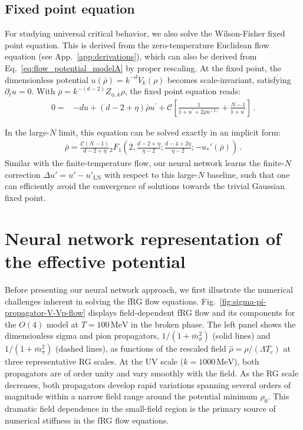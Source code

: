 \documentclass[reprint,twocolumn,superscriptaddress,preprintnumbers,amsmath,amssymb,aps,prd,floatfix]{revtex4-2}
\def\Eq#1{Eq.~\eqref{#1}}
\def\Fig#1{Fig.~\ref{#1}}
\def\App#1{App.~\ref{#1}}
\begin{document}
\subsection{Fixed point equation}
\label{sec:fixedpoint_eq}
For studying universal critical behavior, we also solve the Wilson-Fisher fixed point equation. This is derived from the zero-temperature Euclidean flow equation (see \App{app:derivations}), which can also be derived from \Eq{eq:flow_potential_modelA} by proper rescaling. At the fixed point, the dimensionless potential $u(\bar{\rho})=k^{-d} V_k(\rho)$ becomes scale-invariant, satisfying $\partial_t u = 0$. With $\bar{\rho}=k^{-(d-2)} Z_{\phi, k} \rho$, the fixed point equation reads:
\begin{align}
	0 = & -d u+(d-2+\eta) \bar{\rho} u^{\prime} +\mathscr{C}\left[\frac{1}{1+u^{\prime}+2 \bar{\rho} u^{(2)}}+\frac{N-1}{1+u^{\prime}}\right]\,.
	\label{eq:fixed_point}
\end{align}

In the large-$N$ limit, this equation can be solved exactly in an implicit form:
\begin{align}
	\bar{\rho} = \frac{\mathscr{C}(N-1)}{d-2+\eta}{}_2F_1\left(2,\frac{d-2+\eta}{\eta-2};\frac{d-4+2\eta}{\eta-2};-u_*'(\bar{\rho})\right)\,.
	\label{eq:fixed_point_largeN}
\end{align}
Similar with the finite-temperature flow, our neural network learns the finite-$N$ correction $\Delta u' = u' - u'_{\mathrm{LN}}$ with respect to this large-$N$ baseline, such that one can efficiently avoid the convergence of solutions towards the trivial Gaussian fixed point.



\section{Neural network representation of the effective potential}
\label{sec:PINN}
Before presenting our neural network approach, we first illustrate the numerical challenges inherent in solving the fRG flow equations. \Fig{fig:sigma-pi-propagator-V-Vp-flow} displays field-dependent fRG flow and its components for the $O(4)$ model at $T=100\,\mathrm{MeV}$ in the broken phase. The left panel shows the dimensionless sigma and pion propagators, $1/(1+\bar{m}_{\sigma}^2)$ (solid lines) and $1/(1+\bar{m}_{\pi}^2)$ (dashed lines), as functions of the rescaled field $\hat{\rho}=\rho/(\Lambda T_c)$ at three representative RG scales. At the UV scale ($k=1000\,\mathrm{MeV}$), both propagators are of order unity and vary smoothly with the field. As the RG scale decreases, both propagators develop rapid variations spanning several orders of magnitude within a narrow field range around the potential minimum $\rho_0$. This dramatic field dependence in the small-field region is the primary source of numerical stiffness in the fRG flow equations.
\end{document}
